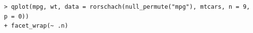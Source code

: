 \documentclass[article]{jss}
\begin{document}
%

\begin{verbatim}
> qplot(mpg, wt, data = rorschach(null_permute("mpg"), mtcars, n = 9, p = 0)) 
+ facet_wrap(~ .n)
\end{verbatim}
\end{document}
